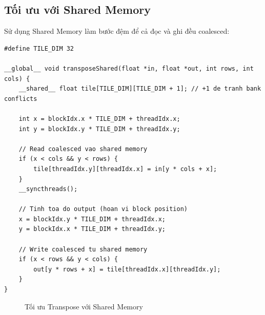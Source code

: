 \subsection{Tối ưu với Shared Memory}

Sử dụng Shared Memory làm bước đệm để cả đọc và ghi đều coalesced:

\begin{lstlisting}[caption={Matrix Transpose với Shared Memory}, label={lst:transpose_shared}]
#define TILE_DIM 32

__global__ void transposeShared(float *in, float *out, int rows, int cols) {
    __shared__ float tile[TILE_DIM][TILE_DIM + 1]; // +1 de tranh bank conflicts
    
    int x = blockIdx.x * TILE_DIM + threadIdx.x;
    int y = blockIdx.y * TILE_DIM + threadIdx.y;
    
    // Read coalesced vao shared memory
    if (x < cols && y < rows) {
        tile[threadIdx.y][threadIdx.x] = in[y * cols + x];
    }
    __syncthreads();
    
    // Tinh toa do output (hoan vi block position)
    x = blockIdx.y * TILE_DIM + threadIdx.x;
    y = blockIdx.x * TILE_DIM + threadIdx.y;
    
    // Write coalesced tu shared memory
    if (x < rows && y < cols) {
        out[y * rows + x] = tile[threadIdx.x][threadIdx.y];
    }
}
\end{lstlisting}

\begin{figure}[H]
\centering
{}
\caption{Tối ưu Transpose với Shared Memory}
\label{fig:transpose_shared}
\end{figure}

